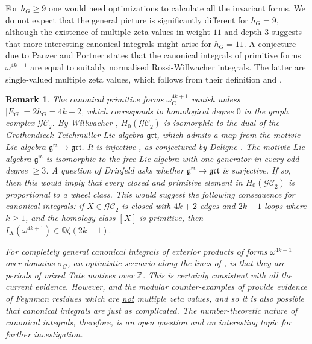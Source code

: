 \documentclass[10pt]{amsart}
\newcommand{\QQ}{{\mathbb Q}}
\newcommand{\ZZ}{{\mathbb Z}}
\theoremstyle{plain}
\newtheorem{remark}[thm]{Remark}
\newcommand{\GC}{\mathcal{GC}}
\newcommand{\0}{\color{blue}{\mathsf{0}}}
\begin{document}
For $h_G\geq9$ one would need optimizations to calculate all  the invariant forms.
We do not expect that the general picture is significantly different  for $h_G=9$, although the existence of multiple zeta values in weight $11$ and depth 3 suggests that more interesting canonical integrals  might arise for $h_G=11$. A conjecture due to Panzer and Portner   \cite[Conjecture 1.2]{Portner} states that the canonical integrals of primitive forms $\omega^{4k+1}$ are equal  to suitably normalised  Rossi-Willwacher integrals. The  latter are  single-valued multiple zeta values, which follows from their  definition  and \cite{BrownDupont, SchlottererSchnetz,  VanhoveZerbini,  BanksPanzerPym}.
\begin{remark}
The canonical primitive forms $\omega^{4k+1}_G$    vanish unless $|E_G| =2 h_G =4k+2 $,
which corresponds to  homological degree $0$ in the graph complex $\GC_2$. By Willwacher \cite{WillwacherGRT}, $H_0(\GC_2)$ is isomorphic to the dual of the Grothendieck-Teichm\"uller Lie algebra $\mathfrak{grt}$, which  admits a map from the motivic Lie algebra $\mathfrak{g}^{\mathfrak{m}} \rightarrow  \mathfrak{grt}$. It   is injective \cite{BrMTZ}, as   conjectured by Deligne \cite{deligneP1}. The motivic Lie algebra $\mathfrak{g}^{\mathfrak{m}}$ is isomorphic to the free Lie algebra with one generator in every odd degree $\geq 3$. A question of Drinfeld \cite{Drinfeld} asks whether $\mathfrak{g}^{\mathfrak{m}}\rightarrow \mathfrak{grt}$ is surjective. If so, then this would imply that every closed and primitive element in $H_0(\GC_2)$ is proportional to a wheel class. 
This  would suggest the following consequence  for canonical integrals: if $ X \in \GC_2$ is closed with  $4k+2$  edges and   $2k+1$ loops where $k\geq 1$, and the homology class $[X]$ is primitive,  then   $I_X(\omega^{4k+1})  \in  \QQ \zeta(2k+1).$ 


For completely general canonical integrals of exterior products of forms $\omega^{4k+1}$ over domains $\sigma_G$, an optimistic scenario along the lines of \cite[\S9.5]{BrSigma}, is that they are periods of  mixed Tate motives over  $\ZZ$. This  is certainly  consistent with all  the current  evidence. 
However,  \cite{BelkaleBrosnan} and the modular counter-examples of \cite{BrownSchnetz} provide evidence of Feynman residues which are \underline{not} multiple zeta values, and  so it is also possible  that canonical integrals are just as complicated. 
The number-theoretic nature of canonical integrals, therefore, is an open question and  an   interesting topic for further investigation.

\end{remark}
\end{document}
